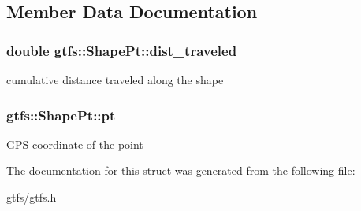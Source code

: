 \subsection{Member Data Documentation}
\subsubsection[{\texorpdfstring{dist\+\_\+traveled}{dist_traveled}}]{\setlength{\rightskip}{0pt plus 5cm}double gtfs\+::\+Shape\+Pt\+::dist\+\_\+traveled}\hypertarget{structgtfs_1_1ShapePt_acb29ef40a33bee6b4000c31731e25073}{}\label{structgtfs_1_1ShapePt_acb29ef40a33bee6b4000c31731e25073}
cumulative distance traveled along the shape 
\subsubsection[{\texorpdfstring{pt}{pt}}]{ gtfs\+::\+Shape\+Pt\+::pt}\hypertarget{structgtfs_1_1ShapePt_ab79eb8263213afd27be9b257fca8515a}{}\label{structgtfs_1_1ShapePt_ab79eb8263213afd27be9b257fca8515a}
G\+PS coordinate of the point 

The documentation for this struct was generated from the following file\+:\begin{DoxyCompactItemize}
\item 
gtfs/gtfs.\+h\end{DoxyCompactItemize}
